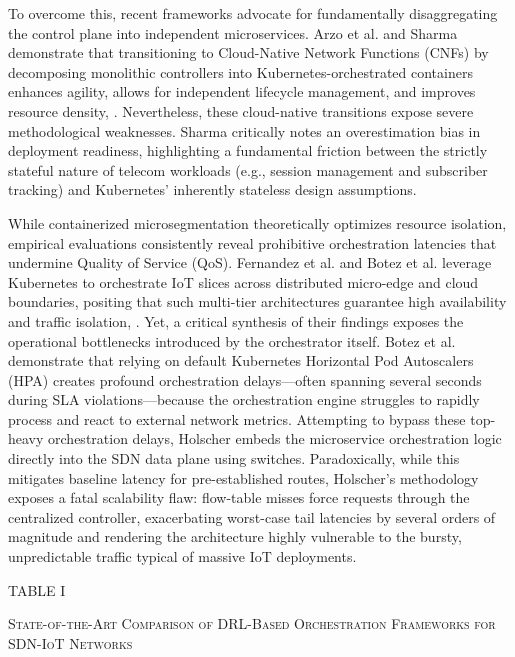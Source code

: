 To overcome this, recent frameworks advocate for fundamentally disaggregating the control plane into independent microservices. Arzo et al. and Sharma demonstrate that transitioning to Cloud-Native Network Functions (CNFs) by decomposing monolithic controllers into Kubernetes-orchestrated containers enhances agility, allows for independent lifecycle management, and improves resource density\cite{b8}, \cite{b10}. Nevertheless, these cloud-native transitions expose severe methodological weaknesses. Sharma critically notes an overestimation bias in deployment readiness, highlighting a fundamental friction between the strictly stateful nature of telecom workloads (e.g., session management and subscriber tracking) and Kubernetes' inherently stateless design assumptions\cite{b10}.

While containerized microsegmentation theoretically optimizes resource isolation, empirical evaluations consistently reveal prohibitive orchestration latencies that undermine Quality of Service (QoS). Fernandez et al. and Botez et al. leverage Kubernetes to orchestrate IoT slices across distributed micro-edge and cloud boundaries, positing that such multi-tier architectures guarantee high availability and traffic isolation\cite{b20}, \cite{b21}. Yet, a critical synthesis of their findings exposes the operational bottlenecks introduced by the orchestrator itself. Botez et al. demonstrate that relying on default Kubernetes Horizontal Pod Autoscalers (HPA) creates profound orchestration delays---often spanning several seconds during SLA violations---because the orchestration engine struggles to rapidly process and react to external network metrics\cite{b20}. Attempting to bypass these top-heavy orchestration delays, Holscher embeds the microservice orchestration logic directly into the SDN data plane using switches\cite{b21}. Paradoxically, while this mitigates baseline latency for pre-established routes, Holscher's methodology exposes a fatal scalability flaw: flow-table misses force requests through the centralized controller, exacerbating worst-case tail latencies by several orders of magnitude and rendering the architecture highly vulnerable to the bursty, unpredictable traffic typical of massive IoT deployments\cite{b21}.

TABLE I

\textsc{State-of-the-Art Comparison of DRL-Based Orchestration Frameworks for SDN-IoT Networks}

